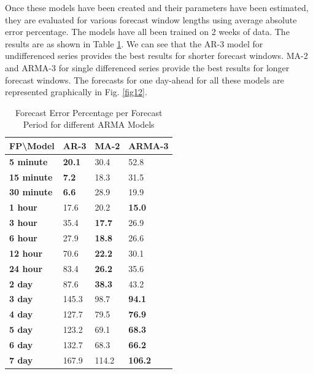 \documentclass[journal]{IEEEtran}
\begin{document}
Once these models have been created and their parameters have been estimated, they are evaluated for various forecast window lengths using average absolute error percentage. The models have all been trained on 2 weeks of data. The results are as shown in Table \ref{tab4}. We can see that the AR-3 model for undifferenced series provides the best results for shorter forecast windows. MA-2 and ARMA-3 for single differenced series provide the best results for longer forecast windows. The forecasts for one day-ahead for all these models are represented graphically in Fig. \ref{fig12}.

\begin{table}[htpb]
  \centering
  \caption{Forecast Error Percentage per Forecast Period for different ARMA Models}
\begin{tabular}{|l|l|l|l|}
\hline
\textbf{FP\textbackslash{}Model} & \textbf{AR-3} & \textbf{MA-2} & \textbf{ARMA-3} \\ \hline
\textbf{5 minute}                & \textbf{20.1} & 30.4          & 52.8            \\ \hline
\textbf{15 minute}               & \textbf{7.2}  & 18.3          & 31.5            \\ \hline
\textbf{30 minute}               & \textbf{6.6}  & 28.9          & 19.9            \\ \hline
\textbf{1 hour}                  & 17.6          & 20.2          & \textbf{15.0}   \\ \hline
\textbf{3 hour}                  & 35.4          & \textbf{17.7} & 26.9            \\ \hline
\textbf{6 hour}                  & 27.9          & \textbf{18.8} & 26.6            \\ \hline
\textbf{12 hour}                 & 70.6          & \textbf{22.2} & 30.1            \\ \hline
\textbf{24 hour}                 & 83.4          & \textbf{26.2} & 35.6            \\ \hline
\textbf{2 day}                   & 87.6          & \textbf{38.3} & 43.2            \\ \hline
\textbf{3 day}                   & 145.3         & 98.7          & \textbf{94.1}   \\ \hline
\textbf{4 day}                   & 127.7         & 79.5          & \textbf{76.9}   \\ \hline
\textbf{5 day}                   & 123.2         & 69.1          & \textbf{68.3}   \\ \hline
\textbf{6 day}                   & 132.7         & 68.3          & \textbf{66.2}   \\ \hline
\textbf{7 day}                   & 167.9         & 114.2         & \textbf{106.2}           \\ \hline
\end{tabular}
\label{tab4}
\end{table}
\end{document}
